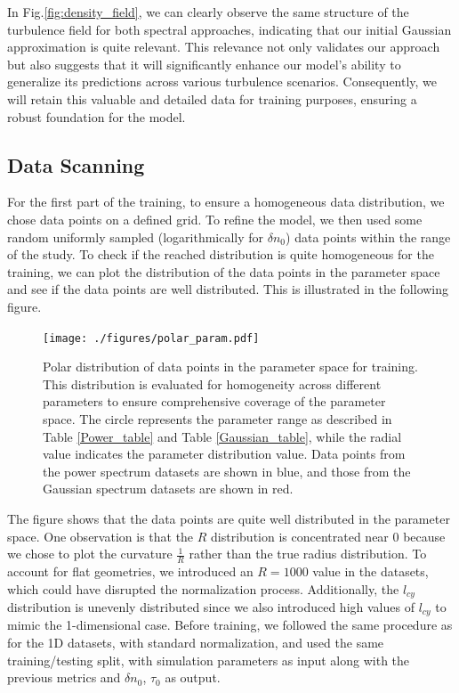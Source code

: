 \documentclass[11pt,openany]{report}
\begin{document}
\begin{multicols}{2}
    In Fig.\ref{fig:density_field}, we can clearly observe the same structure of the turbulence field for both spectral approaches, indicating that our initial Gaussian approximation is quite relevant. This relevance not only validates our approach but also suggests that it will significantly enhance our model's ability to generalize its predictions across various turbulence scenarios. Consequently, we will retain this valuable and detailed data for training purposes, ensuring a robust foundation for the model.

    \subsection{Data Scanning}

    For the first part of the training, to ensure a homogeneous data distribution, we chose data points on a defined grid. To refine the model, we then used some random uniformly sampled (logarithmically for $\delta n_0$) data points within the range of the study. To check if the reached distribution is quite homogeneous for the training, we can plot the distribution of the data points in the parameter space and see if the data points are well distributed. This is illustrated in the following figure.

    \begin{figure}[H]
        \centering
        \texttt{[image: ./figures/polar\_param.pdf]}
        \caption{Polar distribution of data points in the parameter space for training. This distribution is evaluated for homogeneity across different parameters to ensure comprehensive coverage of the parameter space. The circle represents the parameter range as described in Table \ref{Power_table} and Table \ref{Gaussian_table}, while the radial value indicates the parameter distribution value. Data points from the power spectrum datasets are shown in blue, and those from the Gaussian spectrum datasets are shown in red.}
        \label{params_distr}
    \end{figure}
    The figure shows that the data points are quite well distributed in the parameter space. One observation is that the $R$ distribution is concentrated near 0 because we chose to plot the curvature $\frac{1}{R}$ rather than the true radius distribution. To account for flat geometries, we introduced an $R = 1000$ value in the datasets, which could have disrupted the normalization process. Additionally, the $l_{cy}$ distribution is unevenly distributed since we also introduced high values of $l_{cy}$ to mimic the 1-dimensional case. Before training, we followed the same procedure as for the 1D datasets, with standard normalization, and used the same training/testing split, with simulation parameters as input along with the previous metrics and $\delta n_0$, $\tau_0$ as output.


\end{multicols}
\end{document}
